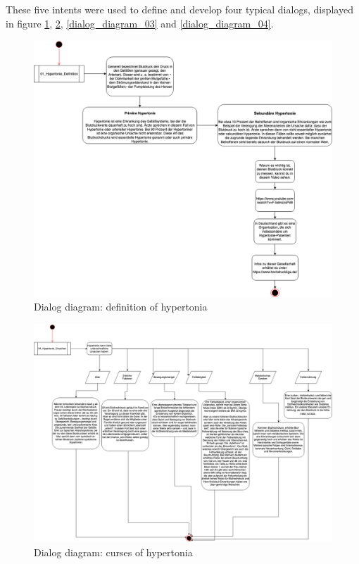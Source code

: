 These five intents were used to define and develop four typical dialogs, displayed in figure \ref{dialog_diagram_01}, \ref{dialog_diagram_02}, \ref{dialog_diagram_03} and \ref{dialog_diagram_04}.

\begin{figure}[h]
	\centering
	\includegraphics[width=1\textwidth]{images/01_Hypertonie_Definition.png}
	\caption{Dialog diagram: definition of hypertonia}
	\label{dialog_diagram_01}
\end{figure}

\begin{figure}[h]
	\centering
	\includegraphics[width=1\textwidth]{images/02_Hypertonie_Ursachen.png}
	\caption{Dialog diagram: curses of hypertonia}
	\label{dialog_diagram_02}
\end{figure}


